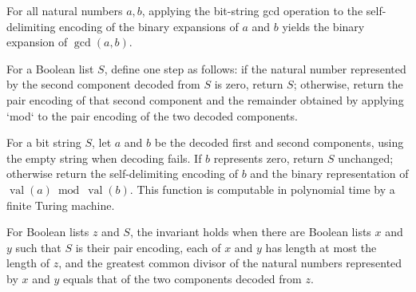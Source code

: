\begin{theorem}
\label{Complexity.BinArith.gcd_pairEncode}
\leanok
{}
For all natural numbers $a,b$, applying the bit-string gcd operation to the
self-delimiting encoding of the binary expansions of $a$ and $b$ yields the binary
expansion of $\gcd(a,b)$.
\end{theorem}

\begin{definition}
\label{Complexity.BinArith.gcdStep}
\leanok
{}
For a Boolean list $S$, define one step as follows: if the natural number represented by
the second component decoded from $S$ is zero, return $S$; otherwise, return the pair
encoding of that second component and the remainder obtained by applying `mod` to the
pair encoding of the two decoded components.
\end{definition}

\begin{theorem}
\label{Complexity.BinArith.polyTimeComputable_gcdStep}
\leanok
{}
For a bit string $S$, let $a$ and $b$ be the decoded first and second components, using
the empty string when decoding fails. If $b$ represents zero, return $S$ unchanged;
otherwise return the self-delimiting encoding of $b$ and the binary representation of
$\operatorname{val}(a)\bmod\operatorname{val}(b)$. This function is computable in
polynomial time by a finite Turing machine.
\end{theorem}

\begin{definition}
\label{Complexity.BinArith.GcdInv}
\leanok
{}
For Boolean lists $z$ and $S$, the invariant holds when there are Boolean lists $x$ and
$y$ such that $S$ is their pair encoding, each of $x$ and $y$ has length at most the
length of $z$, and the greatest common divisor of the natural numbers represented by $x$
and $y$ equals that of the two components decoded from $z$.
\end{definition}

